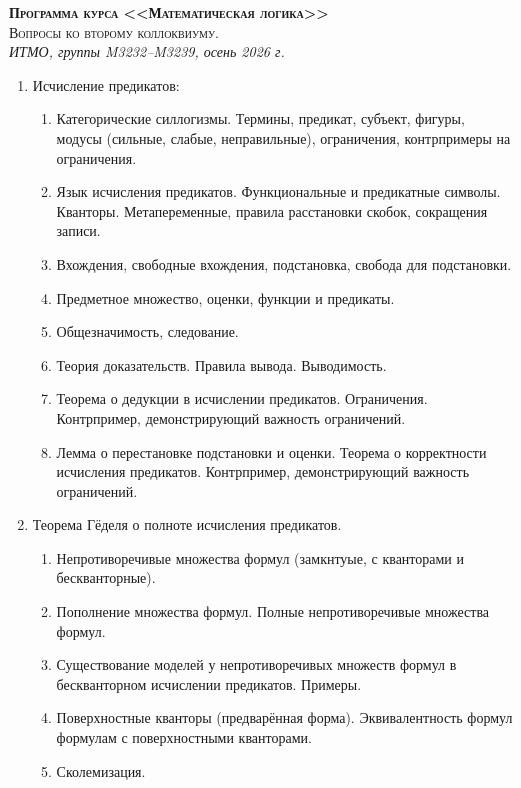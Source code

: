 \documentclass[11pt,a4paper,oneside]{scrartcl}
\begin{document}
\pagestyle{empty}

\begin{center}
{\large\scshape\bfseries Программа курса <<Математическая логика>>}\\
{\large\scshape Вопросы ко второму коллоквиуму.}\\
\itshape ИТМО, группы M3232--M3239, осень 2026 г.
\end{center}


\begin{enumerate}
\item Исчисление предикатов:
\begin{enumerate}
\item Категорические силлогизмы. Термины, предикат, субъект, фигуры, 
модусы (сильные, слабые, неправильные),
ограничения, контрпримеры на ограничения.
\item Язык исчисления предикатов. Функциональные и предикатные символы. Кванторы. 
Метапеременные, правила расстановки скобок, сокращения записи.
\item Вхождения, свободные вхождения, подстановка, свобода для подстановки.
\item Предметное множество, оценки, функции и предикаты.
\item Общезначимость, следование.
\item Теория доказательств. Правила вывода. Выводимость.
\item Теорема о дедукции в исчислении предикатов. Ограничения.
Контрпример, демонстрирующий важность ограничений.
\item Лемма о перестановке подстановки и оценки. Теорема о корректности исчисления предикатов.
Контрпример, демонстрирующий важность ограничений.
\end{enumerate}
\item Теорема Гёделя о полноте исчисления предикатов.
\begin{enumerate}
\item Непротиворечивые множества формул (замкнтуые, с кванторами и бескванторные).
\item Пополнение множества формул. Полные непротиворечивые множества формул.
\item Существование моделей у непротиворечивых множеств формул в 
бескванторном исчислении предикатов. Примеры.
\item Поверхностные кванторы (предварённая форма). Эквивалентность формул 
формулам с поверхностными кванторами.
\item Сколемизация.

\end{enumerate}
\end{enumerate}
\end{document}
